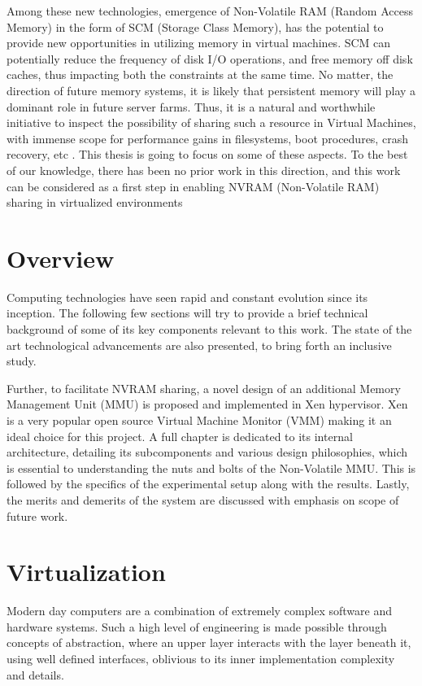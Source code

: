 Among these new technologies, emergence of Non-Volatile RAM (Random Access Memory) in the form of SCM (Storage Class Memory), has the potential to provide new opportunities in utilizing memory in virtual machines. SCM can potentially reduce the frequency of disk I/O operations, and free memory off disk caches, thus impacting both the constraints at the same time. No matter, the direction of future memory systems, it is likely that persistent memory will play a dominant role in future server farms. Thus, it is a natural and worthwhile initiative to inspect the possibility of sharing such a resource in Virtual Machines, with immense scope for performance gains in filesystems, boot procedures, crash recovery, etc \cite{nvm_benefits1} \cite{nvm_benefits2}. This thesis is going to focus on some of these aspects. To the best of our knowledge, there has been no prior work in this direction, and this work can be considered as a first step in enabling NVRAM (Non-Volatile RAM) sharing in virtualized environments 

\section{Overview}

Computing technologies have seen rapid and constant evolution since its inception. The following few sections will try to provide a brief technical background of some of its key components relevant to this work. The state of the art technological advancements are also presented, to bring forth an inclusive study.

Further, to facilitate NVRAM sharing, a novel design of an additional Memory Management Unit (MMU) is proposed and implemented in Xen hypervisor. Xen is a very popular open source Virtual Machine Monitor (VMM) making it an ideal choice for this project. A full chapter is dedicated to its internal architecture, detailing its subcomponents and various design philosophies, which is essential to understanding the nuts and bolts of the Non-Volatile MMU. This is followed by the specifics of the experimental setup along with the results. Lastly, the merits and demerits of the system are discussed with emphasis on scope of future work. 

\section{Virtualization}
Modern day computers are a combination of extremely complex software and hardware systems. Such a high level of engineering is made possible through concepts of abstraction, where an upper layer interacts with the layer beneath it, using well defined interfaces, oblivious to its inner implementation complexity and details.

